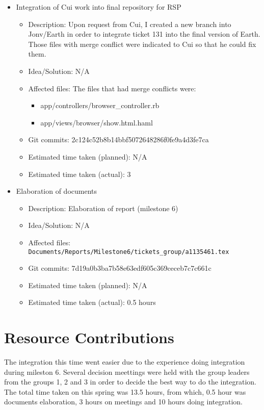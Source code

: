 \documentclass{article}
\begin{document}
\begin{itemize}
\begin{itemize}
	     \end{itemize}
	\item Integration of Cui work into final repository for RSP
	     \begin{itemize}
	        \item Description: Upon request from Cui, I created a new branch into Jonv/Earth in order to integrate ticket 131 into the final version of Earth.  Those files with merge conflict were indicated to Cui so that he could fix them.
		\item Idea/Solution: N/A
		\item Affected files: The files that had merge conflicts were:
                                      \begin{itemize}
                                       \item app/controllers/browser\_controller.rb  
                                       \item app/views/browser/show.html.haml
                                      \end{itemize}
		\item Git commits:  2c124c52b8b14bbf5072648286f0fe9a4d3fe7ca
                \item Estimated time taken (planned): N/A              
		\item Estimated time taken (actual): 3
	      \end{itemize}
       
                
	\item Elaboration of documents
	     \begin{itemize}
	         \item Description: Elaboration of report (milestone 6)
	         \item Idea/Solution: N/A
	         \item Affected files: \texttt{Documents/Reports/Milestone6/tickets\_group/a1135461.tex}
	         \item Git commits:   7d19a0b3ba7b58e63edf605c369ceceb7c7c661c
		 \item Estimated time taken (planned): N/A
	         \item Estimated time taken (actual): 0.5 hours 
	     \end{itemize}
\end{itemize}

\section*{Resource Contributions}

The integration this  time went easier due to the experience doing integration during mileston 6.  Several decision meettings were held with the group leaders from the groups 1, 2 and 3 in order to decide the best way to do the integration.  The total time taken on this spring was 13.5 hours, from which, 0.5 hour was documents elaboration, 3 hours on meetings and 10 hours doing integration. 
\end{document}
